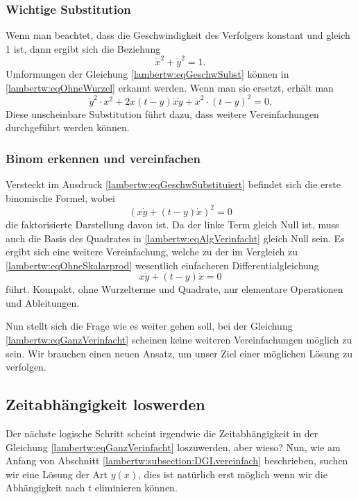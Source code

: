 \subsubsection{Wichtige Substitution
	\label{lambertw:subsubsection:WichtSubst}}
Wenn man beachtet, dass die Geschwindigkeit des Verfolgers konstant und gleich 1 ist, dann ergibt sich die Beziehung  
\begin{equation}
	\dot{x}^2 + \dot{y}^2 
	= 1.
	\label{lambertw:eqGeschwSubst}
\end{equation}
Umformungen der Gleichung \eqref{lambertw:eqGeschwSubst} können in \eqref{lambertw:eqOhneWurzel} erkannt werden. Wenn man sie ersetzt, erhält man
\begin{equation}
	\dot{y}^2 \cdot x^2 +2x \left(t-y\right) \dot{x}\dot{y} + \dot{x}^2 \cdot \left(t-y\right)^2
	=0.
	\label{lambertw:eqGeschwSubstituiert}
\end{equation}
Diese unscheinbare Substitution führt dazu, dass weitere Vereinfachungen durchgeführt werden können.

\subsubsection{Binom erkennen und vereinfachen
	\label{lambertw:subsubsection:BinomVereinfach}}
Versteckt im Ausdruck \eqref{lambertw:eqGeschwSubstituiert} befindet sich die erste binomische Formel, wobei
\begin{equation}
	(x \dot{y} + (t-y) \dot{x})^2
	= 0
	\label{lambertw:eqAlgVerinfacht}
\end{equation}
die faktorisierte Darstellung davon ist.
Da der linke Term gleich Null ist, muss auch die Basis des Quadrates in \eqref{lambertw:eqAlgVerinfacht} gleich Null sein. Es ergibt sich eine weitere Vereinfachung, welche zu der im Vergleich zu \eqref{lambertw:eqOhneSkalarprod} wesentlich einfacheren Differentialgleichung 
\begin{equation}
	x \dot{y} + (t-y) \dot{x}
	= 0
	\label{lambertw:eqGanzVerinfacht}
\end{equation}
führt.
Kompakt, ohne Wurzelterme und Quadrate, nur elementare Operationen und Ableitungen. 

Nun stellt sich die Frage wie es weiter gehen soll, bei der Gleichung \eqref{lambertw:eqGanzVerinfacht} scheinen keine weiteren Vereinfachungen möglich zu sein. Wir brauchen einen neuen Ansatz, um unser Ziel einer möglichen Lösung zu verfolgen.

\subsection{Zeitabhängigkeit loswerden
	\label{lambertw:subsection:ZeitabhLoswerden}}
Der nächste logische Schritt scheint irgendwie die Zeitabhängigkeit in der Gleichung \eqref{lambertw:eqGanzVerinfacht} loszuwerden, aber wieso? Nun, wie am Anfang von Abschnitt \ref{lambertw:subsection:DGLvereinfach} beschrieben, suchen wir eine Lösung der Art \(y(x)\), dies ist natürlich erst möglich wenn wir die Abhängigkeit nach \(t\) eliminieren können.

